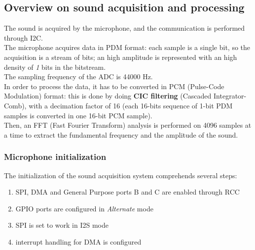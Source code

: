 \subsection{Overview on sound acquisition and processing}
The sound is acquired by the microphone, and the communication is performed through I2C.\\
The microphone acquires data in PDM format: each sample is a single bit, so the acquisition is a stream of bits; an high amplitude is represented with an high density of \textit{1} bits in the bitstream. \\
The sampling frequency of the ADC is 44000 Hz. \\
In order to process the data, it has to be converted in PCM (Pulse-Code Modulation) format: this is done by doing \textbf{CIC filtering} (Cascaded Integrator-Comb), with a decimation factor of 16 (each 16-bits sequence of 1-bit PDM samples is converted in one 16-bit PCM sample).\\
Then, an FFT (Fast Fourier Transform) analysis is performed on 4096 samples at a time to extract the fundamental frequency and the amplitude of the sound.

\subsubsection{Microphone initialization}
The initialization of the sound acquisition system comprehends several steps:
\begin{enumerate}
	\item SPI, DMA and General Purpose ports B and C are enabled through RCC
	\item GPIO ports are configured in \textit{Alternate} mode
	\item SPI is set to work in I2S mode
	\item interrupt handling for DMA is configured
	
\end{enumerate}

